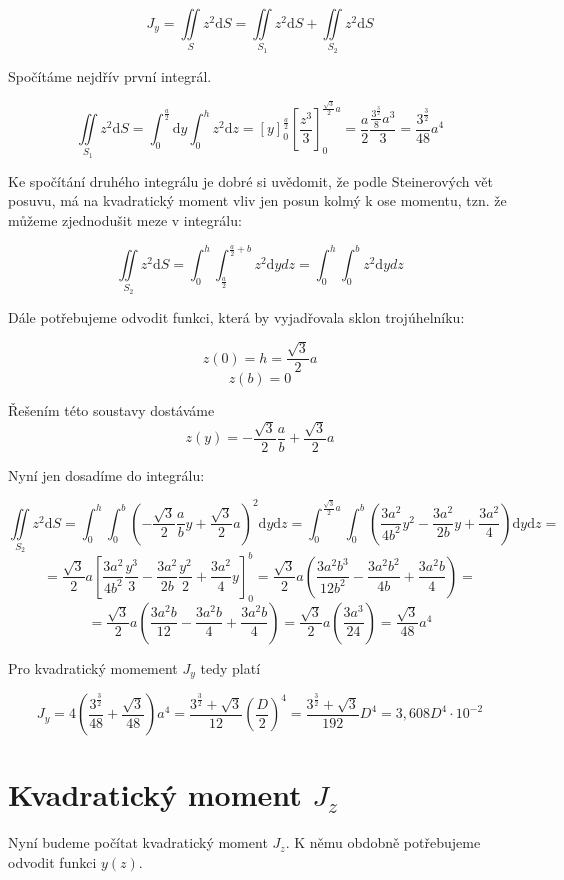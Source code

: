 \documentclass{article}
\begin{document}
\[ J_y=\iint\limits_{S} z^2\mathrm{d}S = \iint\limits_{S_1} z^2\mathrm{d}S + \iint\limits_{S_2} z^2\mathrm{d}S\] 

Spočítáme nejdřív první integrál.

\[ \iint\limits_{S_1} z^2\mathrm{d}S = \int_{0}^{\frac{a}{2}}\mathrm{d}y \int_{0}^{h} z^2 \mathrm{d}z = \left[y\right]_0^{\frac{a}{2}} \left[\frac{z^3}{3}\right]_0^{\frac{\sqrt{3}}{2}a} 
= \frac{a}{2} \frac{\frac{3^{\frac{3}{2}}}{8}a^3}{3} = \frac{3^{\frac{3}{2}}}{48}a^4\] 

Ke spočítání druhého integrálu je dobré si uvědomit, že podle Steinerových vět posuvu, má na kvadratický moment vliv jen posun kolmý k ose momentu, tzn. že můžeme zjednodušit meze v integrálu:

\[ \iint\limits_{S_2} z^2\mathrm{d}S = \int_{0}^{h}\mathrm \int_{\frac{a}{2}}^{\frac{a}{2}+b} z^2 \mathrm {d}y{d}z = \int_{0}^{h}\mathrm \int_{0}^{b} z^2 \mathrm {d}y{d}z\] 

Dále potřebujeme odvodit funkci, která by vyjadřovala sklon trojúhelníku:

\[ z(0)=h=\frac{\sqrt{3}}{2}a \] 
\[ z(b)=0 \]

Řešením této soustavy dostáváme
\[ z(y)=-\frac{\sqrt{3}}{2}\frac{a}{b}+\frac{\sqrt{3}}{2}a \]

Nyní jen dosadíme do integrálu:

\[ \iint\limits_{S_2} z^2\mathrm{d}S = \int_{0}^{h} \int_{0}^{b} \left(-\frac{\sqrt{3}}{2}\frac{a}{b}y+\frac{\sqrt{3}}{2}a\right)^2 \mathrm{d}y \mathrm{d}z 
= \int_{0}^{\frac{\sqrt{3}}{2}a} \int_{0}^{b} \left(\frac{3a^2}{4b^2}y^2 - \frac{3a^2}{2b}y + \frac{3a^2}{4}\right) \mathrm{d}y \mathrm{d}z =\]
\[= \frac{\sqrt{3}}{2}a \left[ \frac{3a^2}{4b^2} \frac{y^3}{3} - \frac{3a^2}{2b} \frac{y^2}{2} + \frac{3a^2}{4} y \right]_{0}^{b}
= \frac{\sqrt{3}}{2}a \left( \frac{3a^2 b^3}{12b^2} - \frac{3a^2 b^2}{4b} + \frac{3a^2 b}{4} \right)=\]  
\[= \frac{\sqrt{3}}{2}a \left( \frac{3a^2 b}{12} - \frac{3a^2 b}{4} + \frac{3a^2 b}{4} \right)
= \frac{\sqrt{3}}{2}a \left( \frac{3a^3}{24} \right) = \frac{\sqrt{3}}{48} a^4\]

Pro kvadratický momement $J_y$ tedy platí

\[ J_y= 4 \left( \frac{3^{\frac{3}{2}}}{48} + \frac{\sqrt{3}}{48} \right) a^4 = 
\frac{3^{\frac{3}{2}}+\sqrt{3}}{12} \left( \frac{D}{2}\right)^4 = \frac{3^{\frac{3}{2}}+\sqrt{3}}{192} D^4 
= 3,608 D^4 \cdot10^{-2}\]

\section{Kvadratický moment $J_z$}
Nyní budeme počítat kvadratický moment $J_z$. K němu obdobně potřebujeme odvodit funkci $y(z)$.
\end{document}
